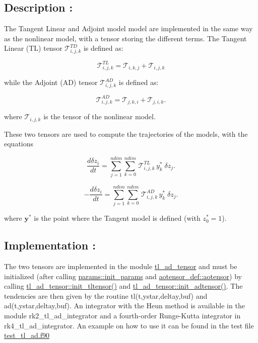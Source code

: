 \subsection*{Description \+:}

The Tangent Linear and Adjoint model model are implemented in the same way as the nonlinear model, with a tensor storing the different terms. The Tangent Linear (TL) tensor $\mathcal{T}_{i,j,k}^{TD}$ is defined as\+:

\[ \mathcal{T}_{i,j,k}^{TL} = \mathcal{T}_{i,k,j} + \mathcal{T}_{i,j,k} \]

while the Adjoint (AD) tensor $\mathcal{T}_{i,j,k}^{AD}$ is defined as\+:

\[ \mathcal{T}_{i,j,k}^{AD} = \mathcal{T}_{j,k,i} + \mathcal{T}_{j,i,k} . \]

where $ \mathcal{T}_{i,j,k}$ is the tensor of the nonlinear model.

These two tensors are used to compute the trajectories of the models, with the equations

\[ \frac{d\delta z_i}{dt} = \sum_{j=1}^{ndim}\sum_{k=0}^{ndim} \, \mathcal{T}_{i,j,k}^{TL} \, y^{\ast}_k \; \delta z_j . \]

\[ -\frac{d\delta z_i}{dt} = \sum_{j=1}^{ndim} \sum_{k=0}^{ndim} \, \mathcal{T}_{i,j,k}^{AD} \, y^{\ast}_k \; \delta z_j . \]

where $\boldsymbol{y}^{\ast}$ is the point where the Tangent model is defined (with $z_0^{\ast}=1$).

\subsection*{Implementation \+:}

The two tensors are implemented in the module \hyperlink{namespacetl__ad__tensor}{tl\+\_\+ad\+\_\+tensor} and must be initialized (after calling \hyperlink{namespaceparams_aa5d1f7f88b00cf3705691de2f6f92a08}{params\+::init\+\_\+params} and \hyperlink{namespaceaotensor__def_a0dc43bc9294a18f2fe57b67489f1702f}{aotensor\+\_\+def\+::aotensor}) by calling \hyperlink{namespacetl__ad__tensor_a8a94fe84e907fc8835f798eddcff38e8}{tl\+\_\+ad\+\_\+tensor\+::init\+\_\+tltensor()} and \hyperlink{namespacetl__ad__tensor_a199cc07a7172f6cf662f9a5bd6f3d45c}{tl\+\_\+ad\+\_\+tensor\+::init\+\_\+adtensor()}. The tendencies are then given by the routine tl(t,ystar,deltay,buf) and ad(t,ystar,deltay,buf). An integrator with the Heun method is available in the module rk2\+\_\+tl\+\_\+ad\+\_\+integrator and a fourth-\/order Runge-\/\+Kutta integrator in rk4\+\_\+tl\+\_\+ad\+\_\+integrator. An example on how to use it can be found in the test file \hyperlink{test__tl__ad_8f90}{test\+\_\+tl\+\_\+ad.\+f90} 